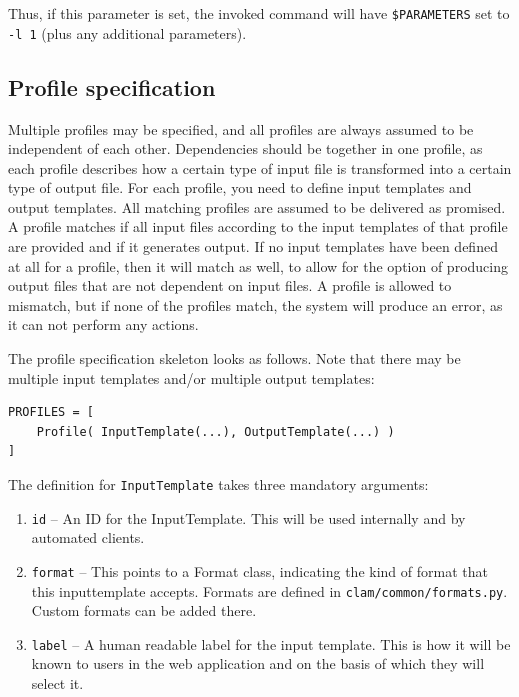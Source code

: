 \documentclass[a4paper,12pt]{report}
\begin{document}
Thus, if this parameter is set, the invoked command will have \texttt{\$PARAMETERS} set to \texttt{-l 1} (plus any additional parameters).

\subsection{Profile specification}

Multiple profiles may be specified, and all profiles are always assumed to be independent of each other. Dependencies should be together in one profile, as each profile describes how a certain type of input file is transformed into a certain type of output file. For each profile, you need to define input templates and output templates. All matching profiles are assumed to be delivered as promised. A profile matches if all input files according to the input templates of that profile are provided and if it generates output. If no input templates have been defined at all for a profile, then it will match as well, to allow for the option of producing output files that are not dependent on input files. A profile is allowed to mismatch, but if none of the profiles match, the system will produce an error, as it can not perform any actions. 

The profile specification skeleton looks as follows. Note that there may be multiple input templates and/or multiple output templates:

{\footnotesize{
\begin{verbatim}
PROFILES = [ 
    Profile( InputTemplate(...), OutputTemplate(...) ) 
]
\end{verbatim}
}}


The definition for \texttt{InputTemplate} takes three mandatory arguments:

\begin{enumerate}
\item \texttt{id} -- An ID for the InputTemplate. This will be used internally and by automated clients.
\item \texttt{format} -- This points to a Format class, indicating the kind of format that this inputtemplate accepts. Formats are defined in \texttt{clam/common/formats.py}. Custom formats can be added there.
\item \texttt{label} -- A human readable label for the input template. This is how it will be known to users in the web application and on the basis of which they will select it.
\end{enumerate}
\end{document}
